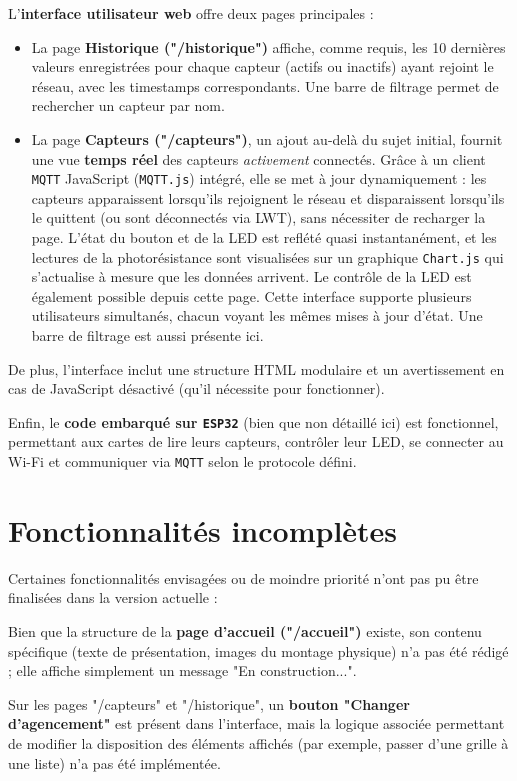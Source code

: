 \documentclass[12pt]{article}
\begin{document}
L'\textbf{interface utilisateur web} offre deux pages principales :
\begin{itemize}
    \item La page \textbf{Historique ("/historique")} affiche, comme requis, les 10 dernières valeurs enregistrées pour chaque capteur (actifs ou inactifs) ayant rejoint le réseau, avec les timestamps correspondants. Une barre de filtrage permet de rechercher un capteur par nom.
    \item La page \textbf{Capteurs ("/capteurs")}, un ajout au-delà du sujet initial, fournit une vue \textbf{temps réel} des capteurs \textit{activement} connectés. Grâce à un client \texttt{MQTT} JavaScript (\texttt{MQTT.js}) intégré, elle se met à jour dynamiquement : les capteurs apparaissent lorsqu'ils rejoignent le réseau et disparaissent lorsqu'ils le quittent (ou sont déconnectés via LWT), sans nécessiter de recharger la page. L'état du bouton et de la LED est reflété quasi instantanément, et les lectures de la photorésistance sont visualisées sur un graphique \texttt{Chart.js} qui s'actualise à mesure que les données arrivent. Le contrôle de la LED est également possible depuis cette page. Cette interface supporte plusieurs utilisateurs simultanés, chacun voyant les mêmes mises à jour d'état. Une barre de filtrage est aussi présente ici.
\end{itemize}
De plus, l'interface inclut une structure HTML modulaire et un avertissement en cas de JavaScript désactivé (qu'il
nécessite pour fonctionner).

Enfin, le \textbf{code embarqué sur \texttt{ESP32}} (bien que non détaillé ici) est fonctionnel, permettant aux cartes de lire leurs capteurs, contrôler leur LED, se connecter au Wi-Fi et communiquer via \texttt{MQTT} selon le protocole défini.

\section{Fonctionnalités incomplètes}

Certaines fonctionnalités envisagées ou de moindre priorité n'ont pas pu être finalisées dans la version actuelle :

Bien que la structure de la \textbf{page d'accueil ("/accueil")} existe, son contenu spécifique (texte de présentation, images du montage physique) n'a pas été rédigé ; elle affiche simplement un message "En construction...".

Sur les pages "/capteurs" et "/historique", un \textbf{bouton "Changer d'agencement"} est présent dans l'interface, mais la logique associée permettant de modifier la disposition des éléments affichés (par exemple, passer d'une grille à une liste) n'a pas été implémentée.
\end{document}

